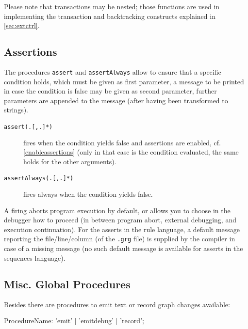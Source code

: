 Please note that transactions may be nested; those functions are used in implementing the transaction and backtracking constructs explained in \ref{sec:extctrl}.


\subsection{Assertions}\label{sec:assert}

The procedures \texttt{assert} and \texttt{assertAlways} allow to ensure that a specific condition holds, which must be given as first parameter, a message to be printed in case the condition is false may be given as second parameter, further parameters are appended to the  message (after having been transformed to strings).

\begin{description}
\item[\texttt{assert(.[,.]*)}] fires when the condition yields false and assertions are enabled, cf. \ref{enableassertions} (only in that case is the condition evaluated, the same holds for the other arguments).
\item[\texttt{assertAlways(.[,.]*)}] fires always when the condition yields false.
\end{description}

A firing aborts program execution by default, or allows you to choose in the debugger how to proceed (in between program abort, external debugging, and execution continuation).
For the asserts in the rule language, a default message reporting the file/line/column (of the \texttt{.grg} file) is supplied by the compiler in case of a missing message (no such default message is available for asserts in the sequences language).


\subsection{Misc. Global Procedures}

Besides there are procedures to emit text or record graph changes available: 

\begin{rail}
  ProcedureName: 'emit' | 'emitdebug' | 'record';
\end{rail}\label{recstmt}


